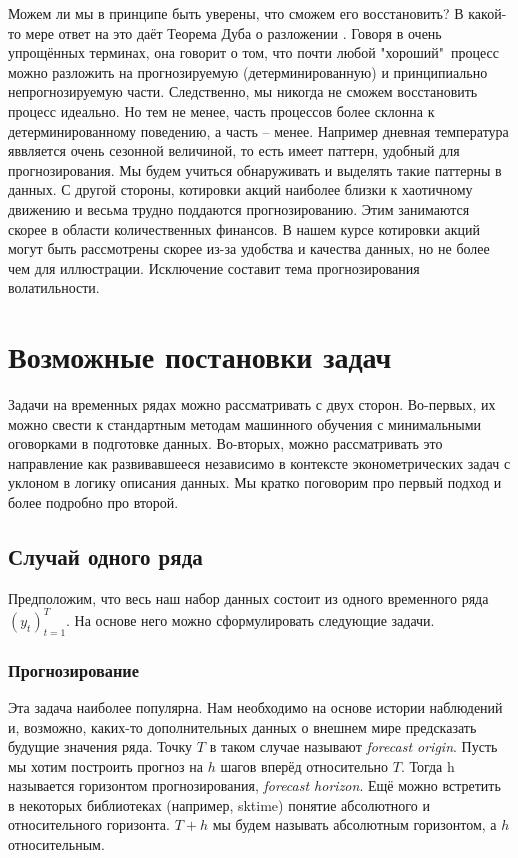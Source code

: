 \documentclass[12pt,fleqn]{article}
\begin{document}
Можем ли мы в принципе быть уверены, что сможем его восстановить? В какой-то мере ответ на это даёт Теорема Дуба о разложении \cite{doob}. Говоря в очень упрощённых терминах, она говорит о том, что почти любой "хороший"\ процесс можно разложить на прогнозируемую (детерминированную) и принципиально непрогнозируемую части. Следственно, мы никогда не сможем восстановить процесс идеально. Но тем не менее, часть процессов более склонна к детерминированному поведению, а часть -- менее. Например дневная температура яввляется очень сезонной величиной, то есть имеет паттерн, удобный для прогнозирования. Мы будем учиться обнаруживать и выделять такие паттерны в данных. С другой стороны, котировки акций наиболее близки к хаотичному движению и весьма трудно поддаются прогнозированию. Этим занимаются скорее в области количественных финансов. В нашем курсе котировки акций могут быть рассмотрены скорее из-за удобства и качества данных, но не более чем для иллюстрации. Исключение составит тема прогнозирования волатильности.




\section{Возможные постановки задач}

Задачи на временных рядах можно рассматривать с двух сторон. Во-первых, их можно свести к стандартным методам машинного обучения с минимальными оговорками в подготовке данных. Во-вторых, можно рассматривать это направление как развивавшееся независимо в контексте эконометрических задач с уклоном в логику описания данных. Мы кратко поговорим про первый подход и более подробно про второй.

\subsection{Случай одного ряда}

Предположим, что весь наш набор данных состоит из одного временного ряда $(y_t)_{t=1}^{T}$.  На основе него можно сформулировать следующие задачи. 

\subsubsection{Прогнозирование}

Эта задача наиболее популярна. Нам необходимо на основе истории наблюдений и, возможно, каких-то дополнительных данных о внешнем мире предсказать будущие значения ряда. Точку $T$ в таком случае называют \emph{forecast origin}. Пусть мы хотим построить прогноз на $h$ шагов вперёд относительно $T$. Тогда h называется горизонтом прогнозирования, \emph{forecast horizon}. Ещё можно встретить в некоторых библиотеках (например, sktime) понятие абсолютного и относительного горизонта. $T+h$ мы будем называть абсолютным горизонтом, а $h$ относительным.
\end{document}
